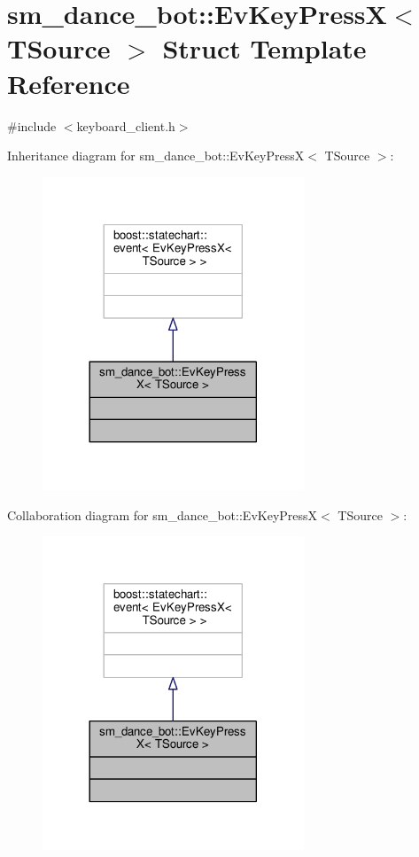 \hypertarget{structsm__dance__bot_1_1EvKeyPressX}{}\section{sm\+\_\+dance\+\_\+bot\+:\+:Ev\+Key\+PressX$<$ T\+Source $>$ Struct Template Reference}
\label{structsm__dance__bot_1_1EvKeyPressX}


{\ttfamily \#include $<$keyboard\+\_\+client.\+h$>$}



Inheritance diagram for sm\+\_\+dance\+\_\+bot\+:\+:Ev\+Key\+PressX$<$ T\+Source $>$\+:
\nopagebreak
\begin{figure}[H]
\begin{center}
\leavevmode
\includegraphics[width=221pt]{structsm__dance__bot_1_1EvKeyPressX__inherit__graph}
\end{center}
\end{figure}


Collaboration diagram for sm\+\_\+dance\+\_\+bot\+:\+:Ev\+Key\+PressX$<$ T\+Source $>$\+:
\nopagebreak
\begin{figure}[H]
\begin{center}
\leavevmode
\includegraphics[width=221pt]{structsm__dance__bot_1_1EvKeyPressX__coll__graph}
\end{center}
\end{figure}


